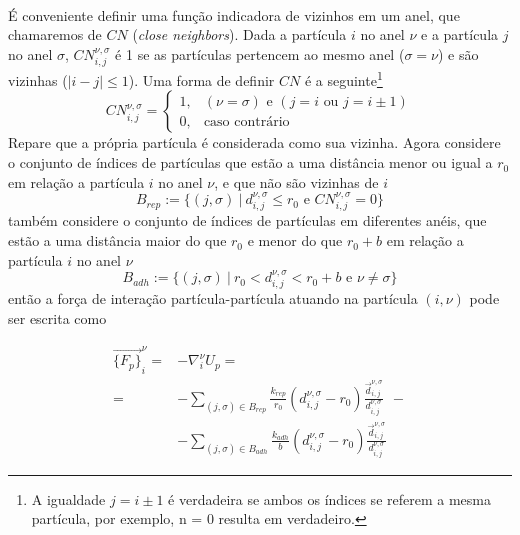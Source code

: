 \documentclass{article}
\theoremstyle{definition}
\def \quantity#1#2#3{\vec{#1}_{#2}^{#3}}
\def \quantitysc#1#2#3{{#1}_{#2}^{#3}}
\def \quantityg#1#2#3#4#5{\vec{#1}_{#2, #3}^{#4, #5}}
\def \quantitygsc#1#2#3#4#5{{#1}_{#2, #3}^{#4, #5}}
\def \deslocg#1#2#3#4{\quantityg{d}{#1}{#2}{#3}{#4}}
\def \deslocgsc#1#2#3#4{\quantitygsc{d}{#1}{#2}{#3}{#4}}
\begin{document}
\paragraph{}
É conveniente definir uma função indicadora de vizinhos em um anel, que chamaremos de $CN$ (\textit{close neighbors}). Dada a partícula $i$ no anel $\nu$ e a partícula $j$ no anel $\sigma$,  $CN_{i, j}^{\nu, \sigma}$ é 1 se as partículas pertencem ao mesmo anel ($\sigma = \nu$) e são vizinhas ($|i - j| \leq 1$). Uma forma de definir $CN$ é a seguinte\footnote{A igualdade $j=i\pm 1$ é verdadeira se ambos os índices se referem a mesma partícula, por exemplo, n = 0 resulta em verdadeiro.}
\begin{equation}
CN_{i, j}^{\nu, \sigma} = \begin{cases}
        1,& (\nu = \sigma) \text{ e } (j=i \text{ ou } j = i \pm 1) \\
        0,& \text{caso contrário}
    \end{cases}
    \label{eq:close_neihbors}
\end{equation}
Repare que a própria partícula é considerada como sua vizinha. Agora considere o conjunto de índices de partículas que estão a uma distância menor ou igual a $r_0$ em relação a partícula $i$ no anel $\nu$, e que não são vizinhas de $i$ 
\[
B_{rep} := \{(j, \sigma)~|~ \deslocgsc{i}{j}{\nu}{\sigma} \leq r_0 \text{ e } CN_{i, j}^{\nu, \sigma} = 0 \}
\]
também considere o conjunto de índices de partículas em diferentes anéis, que estão a uma distância maior do que $r_0$ e menor do que $r_0 + b$ em relação a partícula $i$ no anel $\nu$
\[
B_{adh} := \{(j, \sigma)~|~ r_0 < \deslocgsc{i}{j}{\nu}{\sigma} < r_0+b \text{ e } \nu \neq \sigma\}
\]
então a força de interação partícula-partícula atuando na partícula $(i, \nu)$ pode ser escrita como

\begin{equation}
\begin{aligned}
    \quantity{\{F_p\}}{i}{\nu} = &- \quantitysc{\nabla}{i}{\nu} U_p = \\ 
    = &-\sum_{(j, \sigma) \in B_{rep}} \frac{k_{rep}}{r_0}(\deslocgsc{i}{j}{\nu}{\sigma} - r_0)\frac{\deslocg{i}{j}{\nu}{\sigma}}{\deslocgsc{i}{j}{\nu}{\sigma}} ~~-\\
    &-\sum_{(j, \sigma) \in B_{adh}} \frac{k_{adh}}{b}(\deslocgsc{i}{j}{\nu}{\sigma} - r_0)\frac{\deslocg{i}{j}{\nu}{\sigma}}{\deslocgsc{i}{j}{\nu}{\sigma}}
\end{aligned}
\label{eq:force_particle_particle}
\end{equation}
\end{document}

